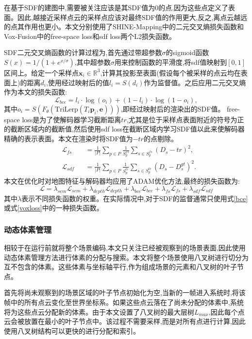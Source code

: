 在基于SDF的建图中,需要被关注应该是其SDF值为0的点,因为这些点定义了表面。因此,越接近采样点云的采样点应该对最终SDF值的作用更大,反之,离点云越远的点其作用也更小。本文分别使用了SHINE-Mapping中的二元交叉熵损失函数和Vox-Fusion中的free-space loss和sdf loss两个L2损失函数。

SDF二元交叉熵函数的计算过程为,首先通过带超参数$\sigma$的sigmoid函数$S(x) = 1/(1 + e^{x/\sigma})$,其中超参数$\sigma$用来控制函数的平滑度,将sdf值映射到$[0,1]$区间上。给定一个采样点$\mathbf{x}_i\in \mathbb{R}^3$,计算其投影至表面(假设每个被采样的点云均在表面上)的距离$d_i$,使用经过映射后的值$l_i=S(d_i)$作为监督值。之后应用二元交叉熵作为本文的损失函数:
\begin{equation}
    \mathcal{L}_{bce} = l_i\cdot \log(o_i)+(1-l_i)\cdot\log(1-o_i),\label{bce}
\end{equation}
其中$o_i=S(F_\theta(\mbox{TriLerp}(T_i\mathbf{p}_i,\mathbf{e})))$,即经过映射后的渲染出的SDF值。
free-space loss是为了使解码器学习截断距离$tr$,尤其是位于采样点表面附近的符号为正的截断区域内的截断值,然后使用sdf loss在截断区域内学习SDF值以此来使解码器精确的表示表面。本文在渲染时将SDF值为$-tr$的点剔除。
\begin{equation}
    \begin{alignedat}{2}
        &\mathcal{L}_{fs} &&= \frac{1}{|P|}\sum_{p\in P}\frac{1}{S_p^{fs}}\sum_{s\in S_p^{fs}}(D_s-tr)^2,\\
    &\mathcal{L}_{sdf} &&= \frac{1}{|P|}\sum_{p\in P}\frac{1}{S_p^{tr}}\sum_{s\in S_p^{tr}}(D_s-D_s^{gt})^2.\label{voxloss}
    \end{alignedat}
\end{equation}
本文在优化时对地图特征与解码器均应用了ADAM\cite{adam}优化方法,最终的损失函数为:
\begin{equation}
    \mathcal{L} = \lambda_{sem}\mathcal{L}_{sem}+\lambda_{depth}\mathcal{L}_{depth}+\lambda_{bce}\mathcal{L}_{bce}+\lambda_{fs}\mathcal{L}_{fs}+\lambda_{sdf}\mathcal{L}_{sdf}
\end{equation}
其中$\lambda$表示不同损失函数的权重。在实际情况中,对于SDF的监督通常只使用式\ref{bce}或式\ref{voxloss}中的一种损失函数。
\subsubsection{动态体素管理}
相较于在运行前就将整个场景编码,本文只关注已经被观察到的场景表面,因此使用动态体素管理方法进行体素的分配与搜索。本文将整个场景使用八叉树进行切分为互不包含的体素。这些体素与坐标轴平行,作为组成场景的元素和八叉树的叶子节点。

首先将尚未观察到的场景区域的叶子节点初始化为空,当新的一帧进入系统时,将该帧中的所有点云变化至世界坐标系。如果这些点云落在了尚未分配的体素中,系统将为这些点云分配新的体素。由于本文设置了八叉树的最大层树$L_{max}$,因此每个点云会被放置在最小的叶子节点中。该过程不需要采样,而是对所有点进行计算,因此使用八叉树结构可以更快的进行分配和索引。
